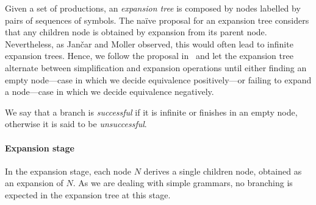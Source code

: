 Given a set of productions, an \emph{expansion tree} is composed by nodes
labelled by pairs of sequences of symbols. The na\"ive proposal for an
expansion tree considers that any children node is obtained by expansion
from its parent node. Nevertheless, as Jan{\v{c}}ar and Moller
observed, this would often lead to infinite expansion trees. Hence,
we follow the proposal in~\cite{janvcar1999techniques} and let the
expansion tree alternate between simplification and expansion operations
until either finding an empty node---case in which we
decide equivalence positively---or failing to expand a node---case in
which we decide equivalence negatively.

We say that a branch
is \emph{successful} if it is infinite or finishes in an empty node,
otherwise it is said to be \emph{unsuccessful}.

\paragraph*{Expansion stage}
In the expansion stage, each node $N$ derives a single children node,
obtained as an expansion of $N$. As we are dealing with simple grammars,
no branching is expected in the expansion tree at this stage.


